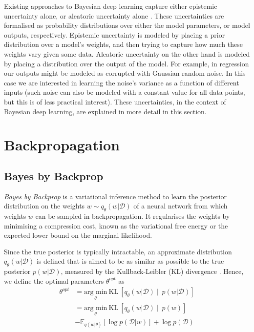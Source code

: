 Existing approaches to Bayesian deep learning capture either epistemic uncertainty alone, or aleatoric uncertainty alone \cite{gal2016thesis}. These uncertainties are formalised as probability distributions over either the model parameters, or model outputs, respectively. Epistemic uncertainty is modeled by placing a prior distribution over a model's weights, and then trying to capture how much these weights vary given some data. Aleatoric uncertainty on the other hand is modeled by placing a distribution over the output of the model. For example, in regression our outputs might be modeled as corrupted with Gaussian random noise. In this case we are interested in learning the noise's variance as a function of different inputs (such noise can also be modeled with a constant value for all data points, but this is of less practical interest). These uncertainties, in the context of Bayesian deep learning, are explained in more detail in this section. 

\section{Backpropagation}
\subsection{Bayes by Backprop}
\textit{Bayes by Backprop} \cite{graves2011practical, blundell2015weight} is a variational inference method to learn the posterior distribution on the weights $w \sim q_{\theta}(w|\mathcal{D})$ of a neural network from which weights $w$ can be sampled in backpropagation. 
It regularises the weights by minimising a compression cost, known as the variational free energy or the expected lower bound on the marginal likelihood.

Since the true posterior is typically intractable, an approximate distribution $q_{\theta}(w|\mathcal{D})$ is defined that is aimed to be as similar as possible to the true posterior $p(w|\mathcal{D})$, measured by the Kullback-Leibler (KL) divergence \cite{kullback1951information}. Hence, we define the optimal parameters $\theta^{opt}$ as
\begin{equation}
    \begin{aligned} \label{KL}
        \theta^{opt}&=\underset{\theta}{\text{arg min}}\ \text{KL} \ [q_{\theta}(w|\mathcal{D})\|p(w|\mathcal{D})] \\
        &=\underset{\theta}{\text{arg min}}\ \text{KL} \ [q_{\theta}(w|\mathcal{D})\|p(w)] \\ & -\mathbb{E}_{q(w|\theta)}[\log p(\mathcal{D}|w)]+\log p(\mathcal{D})
    \end{aligned}
\end{equation}

